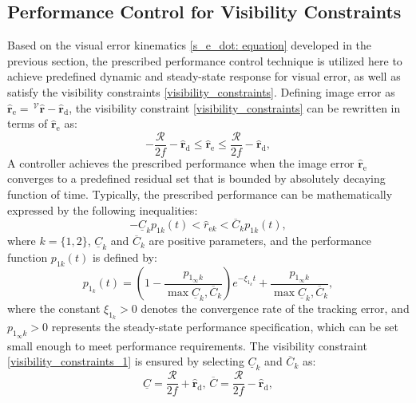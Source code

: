 \documentclass[lettersize,journal]{IEEEtran}
\begin{document}
\subsection{Performance Control for Visibility Constraints}
Based on the visual error kinematics \eqref{s_e_dot: equation} developed in the previous section, the prescribed performance control technique is utilized here to achieve predefined dynamic and steady-state response for visual error, as well as satisfy the visibility constraints \eqref{visibility_constraints}.
Defining image error as $\hat{\boldsymbol{r}}_\text{e} = \,^\mathcal{V} \hat{\boldsymbol{r}} - \hat{\boldsymbol{r}}_\text{d}$, the visibility constraint \eqref{visibility_constraints} can be rewritten in terms of $\hat{\boldsymbol{r}}_\text{e}$ as:
\begin{equation} \label{visibility_constraints_1}
    -\frac{\mathcal{R}}{2f} - \hat{\boldsymbol{r}}_\text{d} \leq \hat{\boldsymbol{r}}_\text{e} \leq \frac{\mathcal{R}}{2f} - \hat{\boldsymbol{r}}_\text{d},
\end{equation}
A controller achieves the prescribed performance when the image error $\hat{\boldsymbol{r}}_\text{e}$ converges to a predefined residual set that is bounded by absolutely decaying function of time. Typically, the prescribed performance can be mathematically expressed by the following inequalities:
\begin{equation}
\label{prescribed perfromance: equation}
    -\underline{C}_{k} p_{1k}(t) < \hat{r}_{\text{e}k} < \overline{C}_{k} p_{1k}(t),
\end{equation}
where $k = \{1, 2\}$, $\underline{C}_{k}$ and $\overline{C}_{k}$ are positive parameters, and the performance function $p_{1k}(t)$ is defined by:
\begin{equation} \label{performance function: equation}
    p_{1_k}(t) = \left(1 - \frac{p_{1_\infty k}}{\max{\underline{C}_{k}, \overline{C}_{k}}}\right) e^{-\xi_{1_k} t} + \frac{p_{1_\infty k}}{\max{\underline{C}_{k}, \overline{C}_{k}}},
\end{equation}
where the constant $\xi_{1_k} > 0$ denotes the convergence rate of the tracking error, and $p_{1_\infty k} > 0$ represents the steady-state performance specification, which can be set small enough to meet performance requirements.
The visibility constraint \eqref{visibility_constraints_1} is ensured by selecting $\underline{C}_{k}$ and $\overline{C}_{k}$ as:
\begin{equation}
    \underline{C} =  \frac{\mathcal{R}}{2f} + \hat{\boldsymbol{r}}_\text{d}, \, \overline{C} =  \frac{\mathcal{R}}{2f} - \hat{\boldsymbol{r}}_\text{d}, 
\end{equation}
\end{document}
